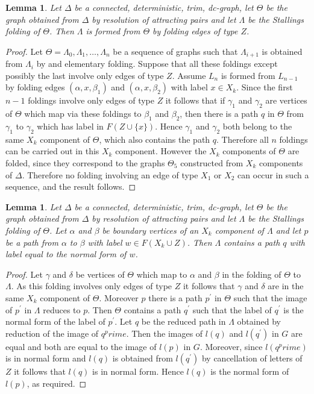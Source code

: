 \documentclass[a4paper,12pt]{article}
\renewcommand{\a}{\alpha }
\renewcommand{\b}{\beta }
\newcommand{\g}{\gamma }
\newcommand{\D}{\Delta }
\renewcommand{\d}{\delta }
\newcommand{\T}{\Theta }
\renewcommand{\L}{\Lambda }
\newtheorem{lemma}[theorem]{Lemma}
\numberwithin{equation}{section}
\numberwithin{figure}{section}
\begin{document}
\begin{lemma}
Let $\D$ be  a connected, deterministic, trim, dc-graph, let $\T$ be 
the graph  
obtained from $\D$ by resolution of attracting pairs and let 
$\L$ be the Stallings folding of $\T$. Then $\L$ is formed from
$\T$ by folding edges of type $Z$. 
\end{lemma}
\begin{proof}
Let $\T=\L_0,\L_1,\ldots, \L_n$ be a sequence of graphs such that
$\L_{i+1}$ is obtained from $\L_i$ by and elementary folding. 
Suppose that all these foldings except possibly the last involve only edges
of type $Z$. Assume $L_n$ is formed from $L_{n-1}$ by folding edges
$(\a,x,\b_1)$ and $(\a,x,\b_2)$ with label $x\in X_k$. Since the 
first $n-1$ foldings involve only edges of type $Z$ it follows that 
if $\g_1$ and $\g_2$ are vertices of $\T$ which map via these foldings
to $\b_1$ and $\b_2$, then there is a path $q$ in $\T$ from $\g_1$ to $\g_2$ 
which has label in $F(Z\cup \{x\})$. Hence $\g_1$ and $\g_2$ both belong to
 the same $X_k$ component of $\T$, which also contains the path $q$. 
Therefore all $n$ foldings can be carried out in this $X_k$
component. However the $X_k$ components of $\T$ are folded, since they
correspond to the graphs $\T_5$ constructed from $X_k$ components of $\D$. 
Therefore no folding involving an edge of type $X_1$ or $X_2$ can occur
in such a sequence, and the result follows.
\end{proof}
\begin{lemma}
Let $\D$ be  a connected, deterministic, trim, dc-graph, let $\T$ be 
the graph  
obtained from $\D$ by resolution of attracting pairs and let 
$\L$ be the Stallings folding of $\T$. Let $\a$  and $\b$ be boundary
vertices of an $X_k$ component of $\L$ and let $p$ be a path from 
$\a$ to $\b$ with label $w\in F(X_k\cup Z)$. Then $\L$ contains a
path $q$ with label equal to the normal form of $w$. 
\end{lemma}
\begin{proof}
Let $\g$ and $\d$ be vertices of $\T$ which map to $\a$ and $\b$ in the
folding of $\T$ to $\L$. As this folding involves only edges of type $Z$
it follows that $\g$ and $\d$ are in the same $X_k$ component of $\T$. 
Moreover $p$ there is a path $p^\prime$ in $\T$ such that the image
of $p^\prime$ in $\L$ reduces to $p$. Then $\T$ contains a path 
$q^\prime$ such that the label of $q^\prime$ is the normal form of 
the label of $p^\prime$. Let $q$ be the reduced path in $\L$ obtained by
reduction of the image of $q^prime$. Then the images of $l(q)$ and 
$l(q^\prime)$ in $G$ are equal and both are equal to the image of $l(p)$ in
$G$. Moreover, since $l(q^prime)$ is in normal form and $l(q)$ is obtained
from $l(q^\prime)$ by cancellation of letters of $Z$ it follows that 
$l(q)$ is in normal form. Hence $l(q)$ is the normal form of $l(p)$,
as required.
\end{proof}
\end{document}
